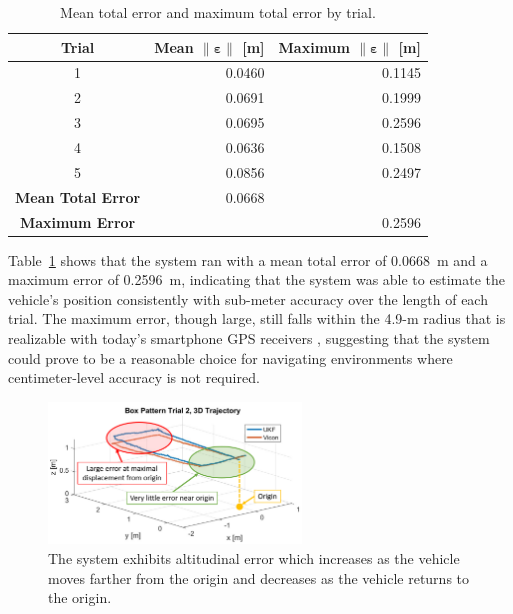 \begin{table}[h]\centering
\caption[Mean Total Error and Maximum Total Error]{Mean total error and maximum total error by trial.}
\begin{tabular}[c]{crr}
\toprule
Trial & Mean $\| \bm{\varepsilon} \|$ [m] & Maximum $\| \bm{\varepsilon} \|$ [m] \\
\hline
1 & 0.0460 & 0.1145 \\
2 & 0.0691 & 0.1999 \\
3 & 0.0695 & 0.2596 \\
4 & 0.0636 & 0.1508 \\
5 & 0.0856 & 0.2497 \\
\hline
\textbf{Mean Total Error} & 0.0668 \\
\hline
\textbf{Maximum Error} && 0.2596 \\
\bottomrule
\end{tabular}
\label{tab:total_err}
\end{table}

Table~\ref{tab:total_err} shows that the system ran with a mean total error of 0.0668~m and a maximum error of 0.2596~m, indicating that the system was able to estimate the vehicle's position consistently with sub-meter accuracy over the length of each trial. The maximum error, though large, still falls within the 4.9-m radius that is realizable with today's smartphone GPS receivers \cite{GpsGov}, suggesting that the system could prove to be a reasonable choice for navigating environments where centimeter-level accuracy is not required.

\begin{figure}[h]
  \centering
    \includegraphics[width=0.6\textwidth]{box_error_diagram}
  \caption[Box Pattern Error Behavior]{The system exhibits altitudinal error which increases as the vehicle moves farther from the origin and decreases as the vehicle returns to the origin.}
  \label{fig:box_error_diagram}
\end{figure}

